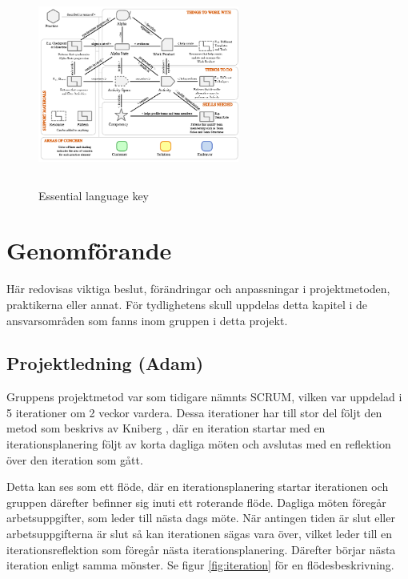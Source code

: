 \documentclass[conference]{IEEEtran}
\begin{document}
\begin{figure}[h!]
    \centerline{\includegraphics[max height=250px, max width=250px]{images/essenceKey.png}}
    \caption{Essential language key}
    \label{fig:essenceKey}
\end{figure}


\section{Genomförande}
Här redovisas viktiga beslut, förändringar och anpassningar i projektmetoden, praktikerna eller annat. För tydlighetens skull uppdelas detta kapitel i de ansvarsområden som fanns inom gruppen i detta projekt.

\subsection{Projektledning (Adam)}
Gruppens projektmetod var som tidigare nämnts SCRUM, vilken var uppdelad i 5 iterationer om 2 veckor vardera. Dessa iterationer har till stor del följt den metod som beskrivs av Kniberg \cite{kniberg_scrum_2015}, där en iteration startar med en iterationsplanering följt av korta dagliga möten och avslutas med en reflektion över den iteration som gått.

Detta kan ses som ett flöde, där en iterationsplanering startar iterationen och gruppen därefter befinner sig inuti ett roterande flöde. Dagliga möten föregår arbetsuppgifter, som leder till nästa dags möte. När antingen tiden är slut eller arbetsuppgifterna är slut så kan iterationen sägas vara över, vilket leder till en iterationsreflektion som föregår nästa iterationsplanering. Därefter börjar nästa iteration enligt samma mönster. Se figur \ref{fig:iteration} för en flödesbeskrivning.
\end{document}
